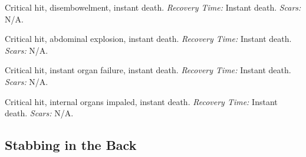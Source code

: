 \documentclass[12pt]{book}
\begin{document}
\begin{description}[labelwidth=1.5em, leftmargin=*, itemsep=0.4em]
    \item[17 -] Critical hit, disembowelment, instant death. \textit{Recovery Time:} Instant death. \textit{Scars:} N/A.
    \item[18 -] Critical hit, abdominal explosion, instant death. \textit{Recovery Time:} Instant death. \textit{Scars:} N/A.
    \item[19 -] Critical hit, instant organ failure, instant death. \textit{Recovery Time:} Instant death. \textit{Scars:} N/A.
    \item[20 -] Critical hit, internal organs impaled, instant death. \textit{Recovery Time:} Instant death. \textit{Scars:} N/A.
\end{description}

\subsection{Stabbing in the Back}
\end{document}
